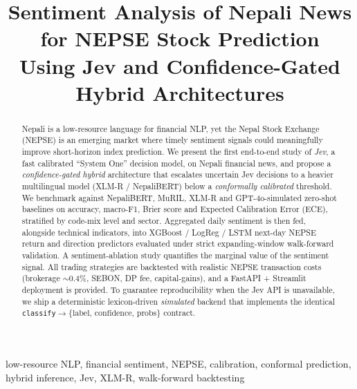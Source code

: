 \documentclass[conference]{IEEEtran}
\title{Sentiment Analysis of Nepali News for NEPSE Stock Prediction\\
       Using Jev and Confidence-Gated Hybrid Architectures}
\author{\IEEEauthorblockN{Anonymous Author(s)}
\IEEEauthorblockA{Nepse NLP Research\\
\texttt{nepse-nlp@research.example}}}
\begin{document}
\maketitle

\begin{abstract}
Nepali is a low-resource language for financial NLP, yet the Nepal Stock Exchange (NEPSE)
is an emerging market where timely sentiment signals could meaningfully improve
short-horizon index prediction. We present the first end-to-end study of
\emph{Jev}, a fast calibrated ``System One'' decision model, on Nepali financial
news, and propose a \emph{confidence-gated hybrid} architecture that escalates
uncertain Jev decisions to a heavier multilingual model (XLM-R / NepaliBERT)
below a \emph{conformally calibrated} threshold. We benchmark against
NepaliBERT, MuRIL, XLM-R and GPT-4o-simulated zero-shot baselines on accuracy,
macro-F1, Brier score and Expected Calibration Error (ECE), stratified by
code-mix level and sector. Aggregated daily sentiment is then fed, alongside
technical indicators, into XGBoost / LogReg / LSTM next-day NEPSE return and
direction predictors evaluated under strict expanding-window walk-forward
validation. A sentiment-ablation study quantifies the marginal value of the
sentiment signal. All trading strategies are backtested with realistic NEPSE
transaction costs (brokerage $\sim$0.4\%, SEBON, DP fee, capital-gains), and a
FastAPI + Streamlit deployment is provided. To guarantee reproducibility
when the Jev API is unavailable, we ship a deterministic lexicon-driven
\emph{simulated} backend that implements the identical
\texttt{classify}$\to\{\text{label, confidence, probs}\}$ contract.
\end{abstract}

\begin{IEEEkeywords}
low-resource NLP, financial sentiment, NEPSE, calibration, conformal prediction,
hybrid inference, Jev, XLM-R, walk-forward backtesting
\end{IEEEkeywords}

\end{document}
